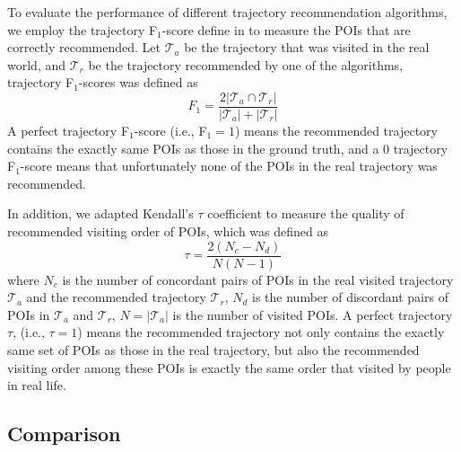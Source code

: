 To evaluate the performance of different trajectory recommendation algorithms,
we employ the trajectory F$_1$-score define in \cite{ijcai15} to measure the POIs that are 
correctly recommended. Let $\mathcal{T}_a$ be the trajectory that was visited in the real world,
and $\mathcal{T}_r$ be the trajectory recommended by one of the algorithms,
trajectory F$_1$-scores was defined as
\begin{displaymath}
    F_1 = \frac{2 |\mathcal{T}_a \cap \mathcal{T}_r|}{|\mathcal{T}_a| + |\mathcal{T}_r|}
\end{displaymath}
A perfect trajectory F$_1$-score (i.e., F$_1 = 1$) means the recommended trajectory contains the exactly 
same POIs as those in the ground truth, and a $0$ trajectory F$_1$-score means that unfortunately none of 
the POIs in the real trajectory was recommended.

In addition, we adapted Kendall's $\tau$ coefficient \cite{kendalltau} to measure the quality of 
recommended visiting order of POIs, which was defined as
\begin{displaymath}
    \tau = \frac{2(N_c - N_d)}{N(N-1)}
\end{displaymath}
where $N_c$ is the number of concordant pairs of POIs in the real visited trajectory $\mathcal{T}_a$ and 
the recommended trajectory $\mathcal{T}_r$, $N_d$ is the number of discordant pairs of POIs in 
$\mathcal{T}_a$ and $\mathcal{T}_r$, $N = |\mathcal{T}_a|$ is the number of visited POIs.
A perfect trajectory $\tau$, (i.e., $\tau = 1$) means the recommended trajectory not only contains the exactly 
same set of POIs as those in the real trajectory, but also the recommended visiting order among these POIs is 
exactly the same order that visited by people in real life.

\subsection{Comparison}
\label{experiment:comparison}

